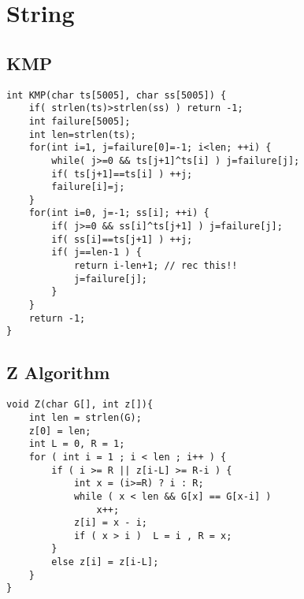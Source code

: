 \documentclass[11pt,twocolumn,a4paper]{article}
\begin{document}
\newpage
\section{String}
\subsection{KMP}
\begin{lstlisting}[label=KMP]
int KMP(char ts[5005], char ss[5005]) {
	if( strlen(ts)>strlen(ss) ) return -1;
	int failure[5005];
	int len=strlen(ts);
	for(int i=1, j=failure[0]=-1; i<len; ++i) {
		while( j>=0 && ts[j+1]^ts[i] ) j=failure[j];
		if( ts[j+1]==ts[i] ) ++j;
		failure[i]=j;
	}
	for(int i=0, j=-1; ss[i]; ++i) {
		if( j>=0 && ss[i]^ts[j+1] ) j=failure[j];
		if( ss[i]==ts[j+1] ) ++j;
		if( j==len-1 ) {
			return i-len+1; // rec this!!
			j=failure[j];
		}
	}
	return -1;
}
\end{lstlisting}

\subsection{Z Algorithm}
\begin{lstlisting}[label=Z Algorithm]
void Z(char G[], int z[]){
	int len = strlen(G);
	z[0] = len;
	int L = 0, R = 1;
	for ( int i = 1 ; i < len ; i++ ) {
		if ( i >= R || z[i-L] >= R-i ) {
			int x = (i>=R) ? i : R;
			while ( x < len && G[x] == G[x-i] )  
				x++;
			z[i] = x - i;
			if ( x > i )  L = i , R = x;	
		}		
		else z[i] = z[i-L];
	}
}
\end{lstlisting}

\newpage
\end{document}

